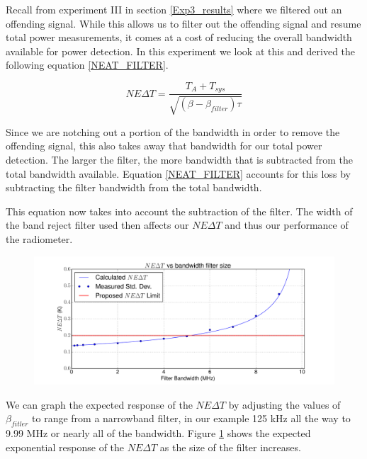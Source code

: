 {Recall from experiment III in section \ref{Exp3_results} where we filtered out an offending signal.  While this allows us to filter out the offending signal and resume total power measurements, it comes at a cost of reducing the overall bandwidth available for power detection.  In this experiment we look at this and derived the following equation \ref{NEAT_FILTER}.

\begin{equation}\label{NEAT_FILTER}
NE\Delta T=\frac{T_{A}+T_{sys}}{\sqrt{(\beta - \beta_{filter})  \tau}}
\end{equation}

Since we are notching out a portion of the bandwidth in order to remove the offending signal, this also takes away that bandwidth for our total power detection.  The larger the filter, the more bandwidth that is subtracted from the total bandwidth available.  Equation \ref{NEAT_FILTER} accounts for this loss by subtracting the filter bandwidth from the total bandwidth.  

This equation now takes into account the subtraction of the filter.  The width of the band reject filter used then affects our $NE\Delta T$ and thus our performance of the radiometer.  

\begin{figure}[h!tb] \centering
\includegraphics[width=\textwidth]{Experiments/Exp5/neatvsbw_plot.pdf}
\label{neat_bw}
\end{figure}

We can graph the expected response of the $NE\Delta T$ by adjusting the values of $\beta_{fitler}$ to range from a narrowband filter, in our example 125 kHz all the way to 9.99 MHz or nearly all of the bandwidth.  Figure \ref{neat_bw} shows the expected exponential response of the $NE\Delta T$ as the size of the filter increases.  

}
